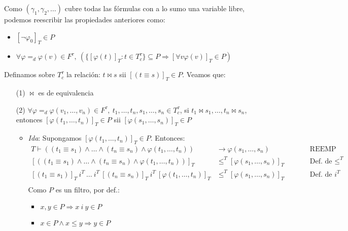 \documentclass{article}
\begin{document}
Como $(\gamma_1,\gamma_2,\dots)$ cubre todas las fórmulas con a lo sumo una variable libre, podemos reescribir las propiedades anteriores como:
\begin{itemize}
  \item $[\neg\varphi_0]_T\in P$
  \item $\forall \varphi=_d\varphi(v)\in F^\tau,\ (\{[\varphi(t)]_T:t\in T^\tau_c\}\subseteq P\Rightarrow [\forall v\varphi(v)]_T\in P)$
\end{itemize}

\vspace{0.3cm}
Definamos sobre $T^\tau_c$ la relación: $t\bowtie s$ sii $[(t\equiv s)]_T\in P$. Veamos que:
\begin{itemize}
  \item[(1)] $\bowtie$ es de equivalencia
  \item[(2)] $\forall\varphi=_d\varphi(v_1,\dots,v_n)\in F^\tau,\ t_1,\dots,t_n,s_1,\dots,s_n\in T^\tau_c$, si $t_1\bowtie s_1,\dots,t_n\bowtie s_n$, entonces $[\varphi(t_1,\dots,t_n)]_T\in P$ sii $[\varphi(s_1,\dots,s_n)]_T\in P$
        \begin{itemize}
          \item \textit{Ida}: Supongamos $[\varphi(t_1,\dots,t_n)]_T\in P$. Entonces:
                \begin{equation*}
                  \begin{alignedat}{2}
                    T\vdash((t_1\equiv s_1)\land\dots\land(t_n\equiv s_n)\land\varphi(t_1,\dots,t_n))          & \to\varphi(s_1,\dots,s_n)        &  & \qquad\text{REEMP}          \\
                    [((t_1\equiv s_1)\land\dots\land(t_n\equiv s_n)\land\varphi(t_1,\dots,t_n))]_T             & \leq^T[\varphi(s_1,\dots,s_n)]_T &  & \qquad\text{Def. de }\leq^T \\
                    [(t_1\equiv s_1)]_T\ i^T\ \dots\ i^T\ [(t_n\equiv s_n)]_T\ i^T\ [\varphi(t_1,\dots,t_n)]_T & \leq^T[\varphi(s_1,\dots,s_n)]_T &  & \qquad\text{Def. de }i^T    \\
                  \end{alignedat}
                \end{equation*}
                Como $P$ es un filtro, por def.:
                \begin{itemize}
                  \item $x,y\in P\Rightarrow x\ i\ y\in P$
                  \item $x\in P\land x\leq y\Rightarrow y\in P$
                \end{itemize}


\end{itemize}
\end{itemize}
\end{document}
